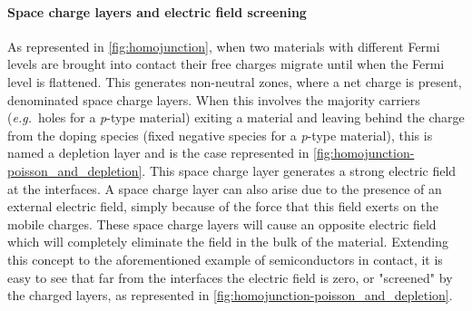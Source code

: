		\paragraph{Space charge layers and electric field screening}\label{intro-space_charge}
		As represented in \cref{fig:homojunction}, when two materials with different Fermi levels are brought into contact their free charges migrate until when the Fermi level is flattened.
		This generates non-neutral zones, where a net charge is present, denominated space charge layers.
		When this involves the majority carriers (\textsl{e.g.}\ holes for a \textit{p}-type material) exiting a material and leaving behind the charge from the doping species (fixed negative species for a \textit{p}-type material), this is named a depletion layer and is the case represented in \cref{fig:homojunction-poisson_and_depletion}.
		This space charge layer generates a strong electric field at the interfaces.
		A space charge layer can also arise due to the presence of an external electric field, simply because of the force that this field exerts on the mobile charges.
		These space charge layers will cause an opposite electric field which will completely eliminate the field in the bulk of the material.
		Extending this concept to the aforementioned example of semiconductors in contact, it is easy to see that far from the interfaces the electric field is zero, or "screened" by the charged layers, as represented in \cref{fig:homojunction-poisson_and_depletion}.

